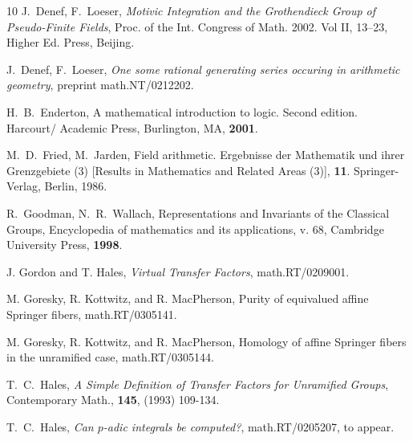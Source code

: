 \documentclass[11pt]{amsart}
\theoremstyle{definition}
\theoremstyle{remark}
\numberwithin{equation}{theorem}
\begin{document}
\begin{thebibliography}{10}
 J.~Denef, F.~Loeser, {\it Motivic Integration and
the Grothendieck Group of Pseudo-Finite Fields}, Proc. of the Int.
Congress of Math.  2002. Vol II, 13--23, Higher Ed. Press,
Beijing.

 J.~Denef, F.~Loeser, {\it One some rational
generating series occuring in arithmetic geometry}, preprint
math.NT/0212202.

 H.~B.~Enderton, A mathematical introduction to logic.
Second edition. Harcourt/ Academic Press, Burlington, MA, {\bf
2001}.

 M.~D.~Fried, M.~Jarden, Field arithmetic.
Ergebnisse der Mathematik und ihrer Grenzgebiete (3) [Results in
Mathematics and Related Areas (3)], {\bf 11}. Springer-Verlag,
Berlin, 1986.




 R.~Goodman, N.~R.~Wallach,  Representations and Invariants
of the Classical Groups, Encyclopedia of mathematics and its
applications, v. 68, Cambridge University Press, {\bf 1998}.

 J. Gordon and T. Hales, {\it Virtual Transfer Factors},
      math.RT/0209001.

 M. Goresky, R. Kottwitz, and R. MacPherson,
Purity of equivalued affine Springer fibers, math.RT/0305141.

 M. Goresky, R. Kottwitz, and R. MacPherson,
Homology of affine Springer fibers in the unramified case,
math.RT/0305144.

 T.~C.~Hales,
{\it A Simple Definition of Transfer Factors for Unramified Groups},
Contemporary Math., {\bf 145}, (1993) 109-134.



 T.~C.~Hales, {\it Can $p$-adic integrals be
computed?}, math.RT/0205207, to appear.


\end{thebibliography}
\end{document}
